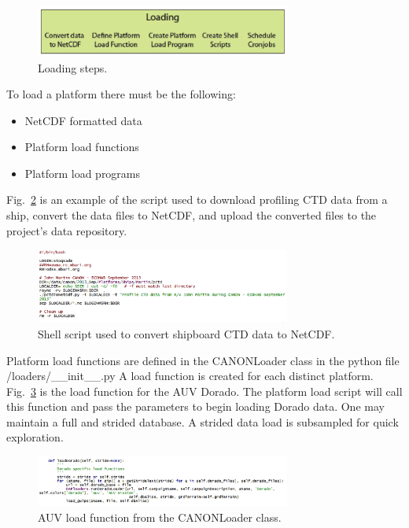 \begin{figure}[htbp]
\centering
\includegraphics[width=3.3in]{ReikoFigure4.png}
\caption{Loading steps.}
\label{fig:ReikoFigure4}
\end{figure}

To load a platform there must be the following:

\begin{itemize}
\item NetCDF formatted data
\item Platform load functions
\item Platform load programs
\end{itemize}

Fig.~\ref{fig:ReikoFigure5} is an example of the script used to download profiling CTD data from a ship, convert the data files to NetCDF, and upload the converted files to the project’s data repository.

\begin{figure}[htbp]
\centering
\includegraphics[width=3.3in]{ReikoFigure5.png}
\caption{Shell script used to convert shipboard CTD data to NetCDF.}
\label{fig:ReikoFigure5}
\end{figure}

Platform load functions are defined in the CANONLoader class in the python file /loaders/\_\_init\_\_.py   A load function is created for each distinct platform.  Fig.~\ref{fig:ReikoFigure6} is the load function for the AUV Dorado.  The platform load script will call this function and pass the parameters to begin loading Dorado data.  One may maintain a full and strided database.  A strided data load is subsampled for quick exploration.

\begin{figure}[htbp]
\centering
\includegraphics[width=3.3in]{ReikoFigure6.png}
\caption{AUV load function from the CANONLoader class.}
\label{fig:ReikoFigure6}
\end{figure}

